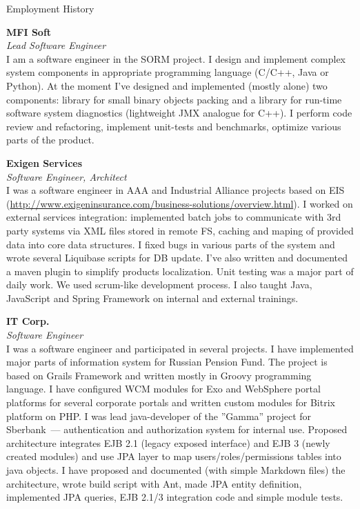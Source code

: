 \begin{rubric}{Employment History}

  \parbox{\EmpHistoryBlock}{
  \textbf{MFI Soft}\\
  \textit{Lead Software Engineer}\\
  I am a software engineer in the SORM project. I design and implement
  complex system components in appropriate programming language
  (C/C++, Java or Python). At the moment I've designed and implemented
  (mostly alone) two components: library for small binary objects
  packing and a library for run-time software system diagnostics
  (lightweight JMX analogue for C++). I perform code review and
  refactoring, implement unit-tests and benchmarks, optimize
  various parts of the product.
  }


  \parbox{\EmpHistoryBlock}{
  \textbf{Exigen Services}\\
  \textit{Software Engineer, Architect}\\
  I was a software engineer in AAA and Industrial Alliance projects
  based on EIS
  (\url{http://www.exigeninsurance.com/business-solutions/overview.html}).
  I worked on external services integration: implemented batch jobs to
  communicate with 3rd party systems via XML files stored in remote
  FS, caching and maping of provided data into core data structures. I
  fixed bugs in various parts of the system and wrote several
  Liquibase scripts for DB update.  I've also written and documented a
  maven plugin to simplify products localization.  Unit testing was a
  major part of daily work.  We used scrum-like development process.
  I also taught Java, JavaScript and Spring Framework on internal and
  external trainings.
  }

  \parbox{\EmpHistoryBlock}{
  \textbf{IT Corp.}\\
  \textit{Software Engineer}\\
  I was a software engineer and participated in several projects.  I
  have implemented major parts of information system for Russian
  Pension Fund.  The project is based on Grails Framework and written
  mostly in Groovy programming language.
  I have configured WCM modules for Exo and WebSphere portal
  platforms for several corporate portals and written custom modules for
  Bitrix platform on PHP.
  I was lead java-developer of the ''Gamma'' project for Sberbank~---
  authentication and authorization system for internal use. Proposed
  architecture integrates EJB 2.1 (legacy exposed interface) and EJB 3
  (newly created modules) and use JPA layer to map
  users/roles/permissions tables into java objects. I have proposed and
  documented (with simple Markdown files) the architecture, wrote
  build script with Ant, made JPA entity definition, implemented JPA
  queries, EJB 2.1/3 integration code and simple module tests.
  }


\end{rubric}

